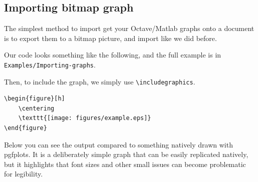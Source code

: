 \subsection{Importing bitmap graph}
The simplest method to import get your Octave/Matlab graphs onto a document is to export them to a bitmap picture, and import like we did before.

Our code looks something like the following\footnotemark, and the full example is in \verb|Examples/Importing-graphs|.


Then, to include the graph, we simply use \verb|\includegraphics|.
\begin{lstlisting}
\begin{figure}[h]
    \centering
    \texttt{[image: figures/example.eps]}
\end{figure}
\end{lstlisting}
Below you can see the output compared to something natively drawn with pgfplots.
It is a deliberately simple graph that can be easily replicated natively, but it highlights that font sizes and other small issues can become problematic for legibility.

